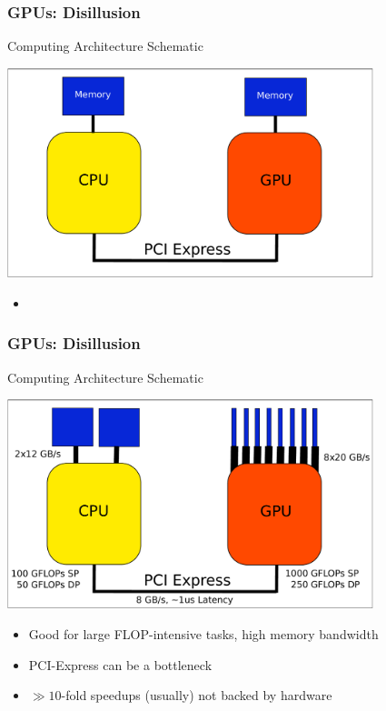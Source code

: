 

\begin{frame}[fragile]
\frametitle{GPUs: Disillusion}
 \begin{block}{Computing Architecture Schematic}
  \begin{center}
   \includegraphics[width=0.8\textwidth]{figures/cpu-gpu-coarse.pdf}
  \end{center}

 
 \begin{itemize}
  \item \vspace*{1.03cm}
 \end{itemize}
 \end{block}

\end{frame}

\begin{frame}[fragile]
\frametitle{GPUs: Disillusion}
 \begin{block}{Computing Architecture Schematic}
  \begin{center}
   \includegraphics[width=0.8\textwidth]{figures/cpu-gpu-detail.pdf}
  \end{center}

 \begin{itemize}
  \item Good for large FLOP-intensive tasks, high memory bandwidth
  \item PCI-Express can be a bottleneck
  \item $\gg 10$-fold speedups (usually) not backed by hardware
 \end{itemize}
 \end{block}

\end{frame}



